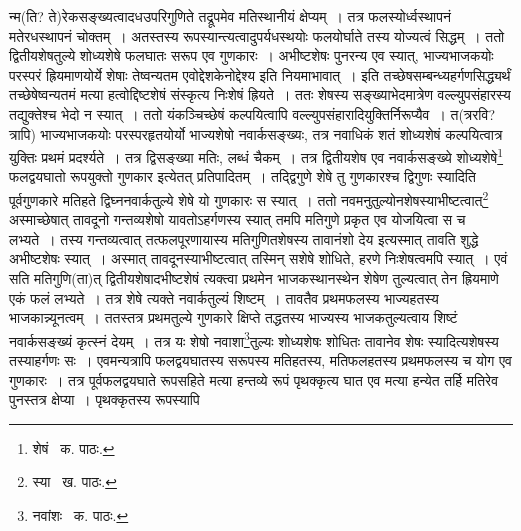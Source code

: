 \documentclass[11pt, openany]{book}
\begin{document}
\noindent न्म(ति? ते)रेकसङ्ख्यत्वादधउपरिगुणिते तद्रूपमेव मतिस्थानीयं क्षेप्यम्~। तत्र फलस्योर्ध्वस्थापनं मतेरधस्थापनं चोक्तम्~। अतस्तस्य
रूपस्यान्त्यत्वादुपर्यधस्थयोः फलयोर्घाते तस्य योज्यत्वं सिद्धम्~। ततो द्वितीयशेषतुल्ये शोध्यशेषे फलघातः सरूप एव गुणकारः~। अभीष्टशेषः पुनरन्य एव स्यात्, भाज्यभाजकयोः परस्परं ह्रियमाणयोर्ये शेषाः तेष्वन्यतम एवोद्देशकेनोद्देश्य इति नियमाभावात्~। इति तच्छेषसम्बन्ध्यहर्गणसिद्ध्यर्थं तच्छेषेष्वन्यतमं मत्या हत्वोद्दिष्टशेषं संस्कृत्य निःशेषं ह्रियते~। ततः शेषस्य सङ्ख्याभेदमात्रेण वल्ल्युपसंहारस्य तद्युक्तेश्च भेदो न स्यात्~। ततो यंकञ्चिच्छेषं कल्पयित्वापि वल्ल्युपसंहारादियुक्तिर्निरूप्यैव~। त(त्ररवि? त्रापि) भाज्यभाजकयोः परस्परहृतयोर्यो भाज्यशेषो नवार्कसङ्ख्यः, तत्र नवाधिकं शतं शोध्यशेषं कल्पयित्वात्र युक्तिः प्रथमं प्रदर्श्यते~। तत्र द्विसङ्ख्या मतिः, लब्धं चैकम्~। तत्र द्वितीयशेष एव नवार्कसङ्ख्ये शोध्यशेषे\renewcommand{\thefootnote}{१}\footnote{शेषं \textendash\ क. पाठः.} फलद्वयघातो रूपयुक्तो गुणकार इत्येतत् प्रतिपादितम्~। तद्द्विगुणे शेषे तु गुणकारश्च द्विगुणः स्यादिति पूर्वगुणकारे मतिहते द्विघ्ननवार्कतुल्ये शेषे यो गुणकारः स स्यात्~। ततो नवमनुतुल्योनशेषस्याभीष्टत्वात्\renewcommand{\thefootnote}{२}\footnote{स्या \textendash\ ख. पाठः.} अस्माच्छेषात् तावदूनो गन्तव्यशेषो यावतोऽहर्गणस्य स्यात् तमपि मतिगुणे प्रकृत एव योजयित्वा स च लभ्यते~। तस्य गन्तव्यत्वात् तत्फलपूरणायास्य मतिगुणितशेषस्य तावानंशो देय इत्यस्मात् तावति शुद्धे अभीष्टशेषः स्यात्~। अस्मात् तावदूनस्याभीष्टत्वात् तस्मिन् सशेषे शोधिते, हरणे निःशेषत्वमपि स्यात्~। एवं सति मतिगुणि(ता)त् द्वितीयशेषादभीष्टशेषं त्यक्त्वा प्रथमेन भाजकस्थानस्थेन शेषेण तुल्यत्वात् तेन ह्रियमाणे एकं फलं लभ्यते~। तत्र शेषे त्यक्ते नवार्कतुल्यं शिष्टम्~। तावतैव प्रथमफलस्य भाज्यहतस्य भाजकान्न्यूनत्वम्~। ततस्तत्र प्रथमतुल्ये गुणकारे क्षिप्ते तद्धतस्य भाज्यस्य भाजकतुल्यत्वाय शिष्टं नवार्कसङ्ख्यं कृत्स्नं देयम्~। तत्र यः शेषो नवाशा\renewcommand{\thefootnote}{३}\footnote{नवांशः \textendash\ क. पाठः.}तुल्यः शोध्यशेषः शोधितः तावानेव शेषः स्यादित्यशेषस्य तस्याहर्गणः सः~। एवमन्यत्रापि फलद्वयघातस्य सरूपस्य मतिहतस्य, मतिफलहतस्य प्रथमफलस्य च योग एव गुणकारः~। तत्र पूर्वफलद्वयघाते रूपसहिते मत्या हन्तव्ये रूपं पृथक्कृत्य घात एव मत्या हन्येत तर्हि मतिरेव पुनस्तत्र क्षेप्या~। पृथक्कृतस्य रूपस्यापि

\newpage
\end{document}
